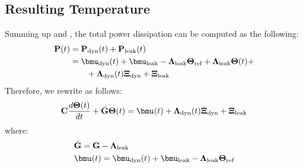 \subsection{Resulting Temperature}
Summing up  and , the total power dissipation can be computed as the following:
\begin{align} \equlabel{total-power}
  \vpower(\time) & = \vpower_{\dyn}(\time) + \vpower_{\leak}(\time) \\
  & = \vmean{\dyn}(\time) + \vmean{\leak} - \ddeviation{\leak} \vtemperature_\refer + \ddeviation{\leak} \vtemperature(\time) + \nonumber \\
  & { } \qquad + \ddeviation{\dyn}(\time) \vnormal_\dyn + \vnormal_\leak \nonumber
\end{align}
Therefore, we rewrite  as follows:
\begin{align} \equlabel{fourier-pv}
  \mcapacitance \frac{d\vtemperature(\time)}{d\time} + \amconductance \vtemperature(\time) = \vmean{}(\time) + \ddeviation{\dyn}(\time) \vnormal_\dyn + \vnormal_\leak
\end{align}
where:
\begin{align*}
  & \a{\mconductance} = \mconductance - \ddeviation{\leak} \\
  & \vmean{}(\time) = \vmean{\dyn}(\time) + \vmean{\leak} - \ddeviation{\leak} \vtemperature_\refer
\end{align*}
